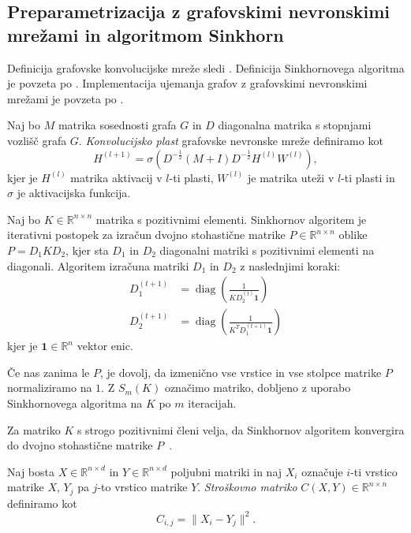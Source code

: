 \documentclass[mat2, tisk]{fmfdelo}
\newcommand{\R}{\mathbb R}
\begin{document}
\subsection{Preparametrizacija z grafovskimi
nevronskimi mrežami in algoritmom Sinkhorn}
\label{dodatek:GNN+sinkhorn}
Definicija grafovske konvolucijske mreže sledi
\cite{DBLP:journals/corr/KipfW16}.
Definicija Sinkhornovega algoritma je povzeta po
\cite{SinkhornKnopp}.
Implementacija
ujemanja grafov z grafovskimi nevronskimi mrežami
je povzeta po
\cite{graphoptimaltransport2020crossdomainalignment}.
\begin{definicija}
  \label{def:GNN}
  Naj bo $M$ matrika sosednosti grafa $G$ in
  $D$ diagonalna matrika s stopnjami vozlišč grafa $G$.
  \emph{Konvolucijsko plast} grafovske nevronske mreže
  definiramo kot
  $$H^{(l+1)} = \sigma \left ( D^{-\frac{1}{2}}
  (M + I) D^{-\frac{1}{2}} H^{(l)} W^{(l)} \right ),$$
  kjer je $H^{(l)}$ matrika aktivacij v $l$-ti plasti,
  $W^{(l)}$ je matrika uteži v $l$-ti plasti in
  $\sigma$ je aktivacijska funkcija.
\end{definicija}
\begin{definicija}
  \label{def:sinkhorn}
  Naj bo $K \in \R^{n \times n}$ matrika s pozitivnimi
  elementi. Sinkhornov algoritem je iterativni postopek za
  izračun dvojno stohastične matrike $P \in \R^{n \times n}$
  oblike $P = D_1 K D_2$, kjer sta $D_1$ in $D_2$ diagonalni
  matriki s pozitivnimi elementi na diagonali.
  Algoritem izračuna matriki $D_1$ in $D_2$ z naslednjimi
  koraki:
  \begin{align*}
    D_1^{(t+1)} &= \operatorname{diag} \left (
    \frac{1}{K D_2^{(t)} \mathbf{1}} \right ) \\
    D_2^{(t+1)} &= \operatorname{diag} \left (
    \frac{1}{K^T D_1^{(t+1)} \mathbf{1}} \right )
  \end{align*}
  kjer je $\mathbf{1} \in \R^n$ vektor enic.

  Če nas zanima le $P$, je dovolj, da izmenično vse vrstice in vse
  stolpce matrike $P$ normaliziramo na $1$. Z $S_m(K)$
  označimo matriko, dobljeno z uporabo Sinkhornovega
  algoritma na $K$
  po $m$ iteracijah.
\end{definicija}
Za matriko $K$ s strogo pozitivnimi členi velja,
da Sinkhornov algoritem konvergira do dvojno stohastične
matrike $P$~\cite[izrek 2.1]{SinkhornKnopp}.
\begin{definicija}
  Naj bosta $X \in \R^{n \times d}$ in
  $Y \in \R^{n \times d}$ poljubni matriki in naj
  $X_i$ označuje $i$-ti vrstico matrike $X$,
  $Y_j$ pa $j$-to vrstico matrike $Y$.
  \emph{Stroškovno matriko} $C(X,Y) \in \R^{n \times n}$
  definiramo kot
  $$C_{i,j} = \|X_i - Y_j\|^2.$$
\end{definicija}
\end{document}
